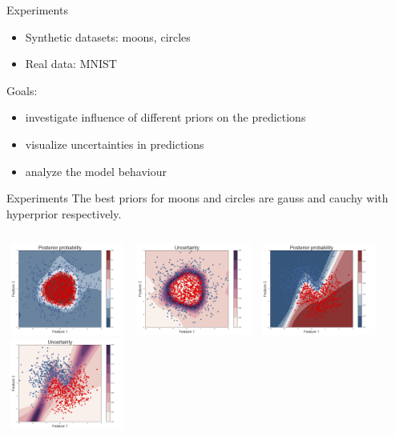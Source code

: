 \documentclass{beamer}
\begin{document}
\begin{frame}{Experiments}
\begin{itemize}
	\item Synthetic datasets: moons, circles
	\item Real data: MNIST
\end{itemize}
Goals:
\begin{itemize}
	\item investigate influence of different priors on the predictions
	\item visualize uncertainties in predictions
	\item analyze the model behaviour
\end{itemize}
\end{frame}
\begin{frame}{Experiments}
	The best priors for moons and circles are gauss and cauchy with hyperprior respectively.
	\begin{columns}[t]
		\centering
			\includegraphics[width=4cm,height=3cm]{pres_pics/inv_cauchy_ppm.png}\ \includegraphics[width=4cm,height=3cm]{pres_pics/inv_cachy_uncert.png}
		\centering
		\includegraphics[width=4cm,height=3cm]{pres_pics/inv_gauss_ppm.png}\    \includegraphics[width=4cm,height=3cm]{pres_pics/inv_gauss_uncert.png}
	\end{columns}
\end{frame}
\end{document}
